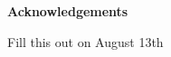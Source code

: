 \thispagestyle{empty}
\begin{center}
	\textbf{\Large{Acknowledgements}}
\end{center}

Fill this out on August 13th

\clearpage